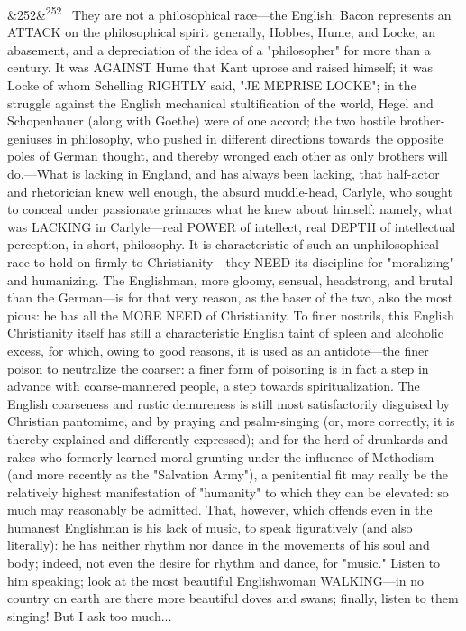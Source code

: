 \documentclass[12pt]{article}
\newcommand{\para}[1][]{\par\noindent\ifx&#1&\else\textsuperscript{\footnotesize #1}~\fi}
\begin{document}
\para[252] They are not a philosophical race---the English: Bacon represents an ATTACK on the philosophical spirit generally, Hobbes, Hume, and Locke, an abasement, and a depreciation of the idea of a "philosopher" for more than a century. It was AGAINST Hume that Kant uprose and raised himself; it was Locke of whom Schelling RIGHTLY said, "JE MEPRISE LOCKE"; in the struggle against the English mechanical stultification of the world, Hegel and Schopenhauer (along with Goethe) were of one accord; the two hostile brother-geniuses in philosophy, who pushed in different directions towards the opposite poles of German thought, and thereby wronged each other as only brothers will do.---What is lacking in England, and has always been lacking, that half-actor and rhetorician knew well enough, the absurd muddle-head, Carlyle, who sought to conceal under passionate grimaces what he knew about himself: namely, what was LACKING in Carlyle---real POWER of intellect, real DEPTH of intellectual perception, in short, philosophy. It is characteristic of such an unphilosophical race to hold on firmly to Christianity---they NEED its discipline for "moralizing" and humanizing. The Englishman, more gloomy, sensual, headstrong, and brutal than the German---is for that very reason, as the baser of the two, also the most pious: he has all the MORE NEED of Christianity. To finer nostrils, this English Christianity itself has still a characteristic English taint of spleen and alcoholic excess, for which, owing to good reasons, it is used as an antidote---the finer poison to neutralize the coarser: a finer form of poisoning is in fact a step in advance with coarse-mannered people, a step towards spiritualization. The English coarseness and rustic demureness is still most satisfactorily disguised by Christian pantomime, and by praying and psalm-singing (or, more correctly, it is thereby explained and differently expressed); and for the herd of drunkards and rakes who formerly learned moral grunting under the influence of Methodism (and more recently as the "Salvation Army"), a penitential fit may really be the relatively highest manifestation of "humanity" to which they can be elevated: so much may reasonably be admitted. That, however, which offends even in the humanest Englishman is his lack of music, to speak figuratively (and also literally): he has neither rhythm nor dance in the movements of his soul and body; indeed, not even the desire for rhythm and dance, for "music." Listen to him speaking; look at the most beautiful Englishwoman WALKING---in no country on earth are there more beautiful doves and swans; finally, listen to them singing! But I ask too much...
\end{document}
